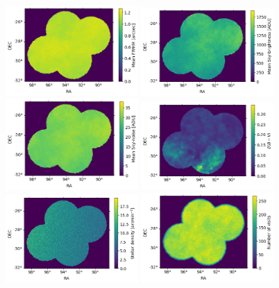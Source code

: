 \documentclass[twocolumn]{aastex62}
\begin{document}
\begin{figure}
\centering
\includegraphics[width=0.45\textwidth]{mean_fwhm.png}
\includegraphics[width=0.45\textwidth]{mean_sky.png}
\includegraphics[width=0.45\textwidth]{mean_skynoise.png}
\includegraphics[width=0.45\textwidth]{extinction.png}
\includegraphics[width=0.45\textwidth]{stellar_density.png}
\includegraphics[width=0.45\textwidth]{nvisits.png}

\end{figure}
\end{document}
